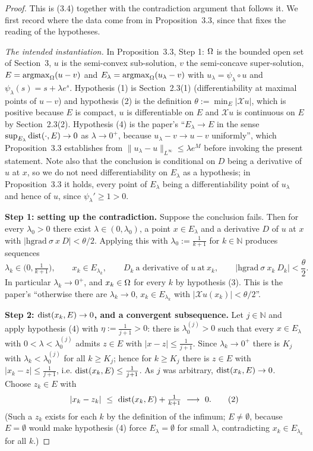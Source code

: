 \begin{proof}
This is (3.4) together with the contradiction argument that follows it. We first
record where the data come from in Proposition~3.3, since that fixes the reading of the
hypotheses.

\medskip\noindent\emph{The intended instantiation.} In Proposition~3.3, Step 1: $\Omega$ is the
bounded open set of Section~3, $u$ is the semi-convex sub-solution, $v$ the semi-concave
super-solution, $E=\operatorname*{argmax}_\Omega(u-v)$ and $E_\lambda=\operatorname*{argmax}_\Omega(u_\lambda-v)$ with
$u_\lambda=\psi_\lambda\circ u$ and $\psi_\lambda(s)=s+\lambda e^{s}$. Hypothesis (1) is
Section~2.3(1) (differentiability at maximal points of $u-v$) and hypothesis (2) is the
definition $\theta:=\min_E|\mathcal Xu|$, which is positive because $E$ is compact, $u$ is
differentiable on $E$ and $\mathcal Xu$ is continuous on $E$ by Section~2.3(2).
Hypothesis (4) is the paper's ``$E_\lambda\to E$ in the sense
$\sup_{E_\lambda}\operatorname{dist}(\cdot,E)\to0$ as $\lambda\to0^{+}$, because $u_\lambda-v\to u-v$
uniformly'', which Proposition~3.3 establishes from $\|u_\lambda-u\|_{L^\infty}\le\lambda e^{M}$
before invoking the present statement. Note also that the conclusion is conditional on $D$
being a derivative of $u$ at $x$, so we do not need differentiability on $E_\lambda$ as a
hypothesis; in Proposition~3.3 it holds, every point of $E_\lambda$ being a differentiability
point of $u_\lambda$ and hence of $u$, since $\psi_\lambda'\ge1>0$.

\medskip\noindent\textbf{Step 1: setting up the contradiction.} Suppose the conclusion
fails. Then for every $\lambda_0>0$ there exist $\lambda\in(0,\lambda_0)$, a point
$x\in E_\lambda$ and a derivative $D$ of $u$ at $x$ with
$|\mathrm{hgrad}\ \sigma\ x\ D|<\theta/2$. Applying this with
$\lambda_0:=\frac1{k+1}$ for $k\in\mathbb N$ produces sequences
\[
 \lambda_k\in\Big(0,\tfrac1{k+1}\Big),\qquad x_k\in E_{\lambda_k},\qquad
 D_k\ \text{a derivative of }u\ \text{at}\ x_k,\qquad
 \big|\mathrm{hgrad}\ \sigma\ x_k\ D_k\big|<\frac\theta2 . \tag{1}
\]
In particular $\lambda_k\to0^{+}$, and $x_k\in\Omega$ for every $k$ by hypothesis (3). This is
the paper's ``otherwise there are $\lambda_k\to0$, $x_k\in E_{\lambda_k}$ with
$|\mathcal Xu(x_k)|<\theta/2$''.

\medskip\noindent\textbf{Step 2: $\operatorname{dist}(x_k,E)\to0$, and a convergent subsequence.} Let
$j\in\mathbb N$ and apply hypothesis (4) with $\eta:=\frac1{j+1}>0$: there is
$\lambda_0^{(j)}>0$ such that every $x\in E_\lambda$ with $0<\lambda<\lambda_0^{(j)}$
admits $z\in E$ with $|x-z|\le\frac1{j+1}$. Since $\lambda_k\to0^{+}$ there is $K_j$ with
$\lambda_k<\lambda_0^{(j)}$ for all $k\ge K_j$; hence for $k\ge K_j$ there is $z\in E$ with
$|x_k-z|\le\frac1{j+1}$, i.e. $\operatorname{dist}(x_k,E)\le\frac1{j+1}$. As $j$ was arbitrary,
$\operatorname{dist}(x_k,E)\to0$. Choose $z_k\in E$ with
\[
 |x_k-z_k|\ \le\ \dist(x_k,E)+\tfrac1{k+1}\ \longrightarrow\ 0 . \tag{2}
\]
(Such a $z_k$ exists for each $k$ by the definition of the infimum; $E\ne\emptyset$,
because $E=\emptyset$ would make hypothesis (4) force $E_\lambda=\emptyset$ for small
$\lambda$, contradicting $x_k\in E_{\lambda_k}$ for all $k$.)


\end{proof}
